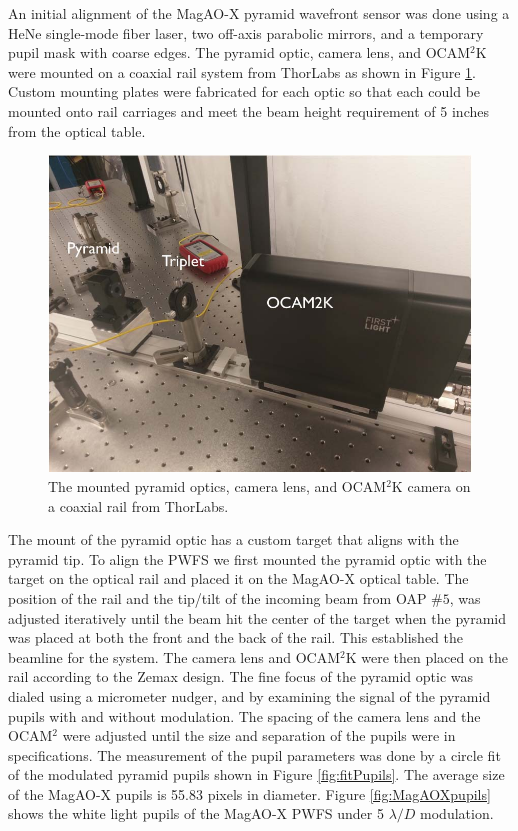 An initial alignment of the MagAO-X pyramid wavefront sensor was done using a HeNe single-mode fiber laser, two off-axis parabolic mirrors, and a temporary pupil mask with coarse edges. The pyramid optic, camera lens, and OCAM$^2$K were mounted on a coaxial rail system from ThorLabs as shown in Figure \ref{fig:mountedPWFS}. Custom mounting plates were fabricated for each optic so that each could be mounted onto rail carriages and meet the beam height requirement of 5 inches from the optical table. 

\begin{figure}
    \centering
    \includegraphics[width=.8\textwidth]{Chapter Materials/Chapter Three Materials/mountedPWFS.jpg}
    \caption{The mounted pyramid optics, camera lens, and OCAM$^2$K camera on a coaxial rail from ThorLabs.}
    \label{fig:mountedPWFS}
\end{figure}

The mount of the pyramid optic has a custom target that aligns with the pyramid tip. To align the PWFS we first mounted the pyramid optic with the target on the optical rail and placed it on the MagAO-X optical table. The position of the rail and the tip/tilt of the incoming beam from OAP $\#5$, was adjusted iteratively until the beam hit the center of the target when the pyramid was placed at both the front and the back of the rail. This established the beamline for the system. The camera lens and OCAM$^2$K were then placed on the rail according to the Zemax design. The fine focus of the pyramid optic was dialed using a micrometer nudger, and by examining the signal of the pyramid pupils with and without modulation. The spacing of the camera lens and the OCAM$^2$ were adjusted until the size and separation of the pupils were in specifications. The measurement of the pupil parameters was done by a circle fit of the modulated pyramid pupils shown in Figure \ref{fig:fitPupils}. The average size of the MagAO-X pupils is 55.83 pixels in diameter. Figure \ref{fig:MagAOXpupils} shows the white light pupils of the MagAO-X PWFS under 5 $\lambda/D$ modulation.

